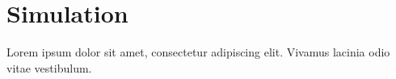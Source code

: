 \documentclass{article}
\begin{document}
\section{Simulation}
Lorem ipsum dolor sit amet, consectetur adipiscing elit. Vivamus lacinia odio vitae vestibulum.

\lipsum[1]
\end{document}
